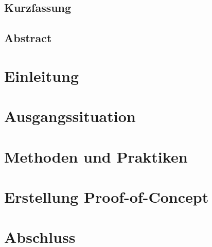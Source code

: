 \documentclass[oneside, ngerman, final, 11pt, a4paper, 1.1headlines, headinclude=false, footinclude=false, mpinclude=false, pagesize, onecolumn, titlepage, parskip=half, headsepline, chapterprefix=false, version=first, listof=totoc, bibliography=totoc, toc=graduated, fleqn, twoside=false]{scrbook}
\begin{document}
	
	\newpage{}
	
	\section*{\thispagestyle{empty}Kurzfassung}
	
	\textit{\lipsum[1-4]}
	
	\newpage{}
	
	\section*{\thispagestyle{empty}Abstract}
	
	\textit{\lipsum[1-4]}
	
	\newpage{}
	
	\setcounter{page}{1}
	
	\tableofcontents{}
	
	\newpage{}
	
	\setcounter{page}{1} 
	
	\chapter{Einleitung}
	
	
	\chapter{Ausgangssituation}
	
	
	\chapter{Methoden und Praktiken}
	
	
	\chapter{Erstellung Proof-of-Concept}
	
	
	\chapter{Abschluss}
	
	
%	
	
\end{document}
